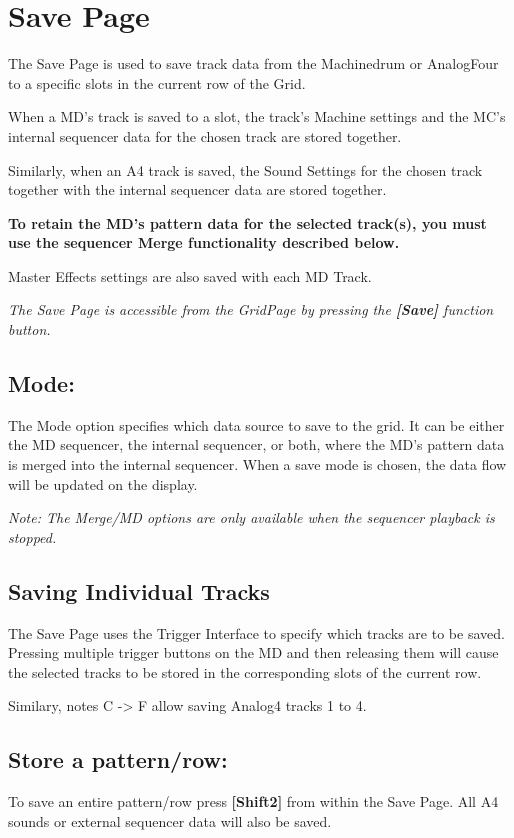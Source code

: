 \chapter{Save Page}

The Save Page is used to save track data from the Machinedrum or AnalogFour to a specific slots in the current row of the Grid.

When a MD's track is saved to a slot, the track's Machine settings and the MC's internal sequencer data for the chosen track are stored together.

Similarly, when an A4 track is saved, the Sound Settings for the chosen track together with the internal sequencer data are stored together.

\textbf{To retain the MD's pattern data for the selected track(s), you must use the sequencer Merge functionality described below.}

Master Effects settings are also saved with each MD Track.


\textit{The Save Page is accessible from the GridPage by pressing the  \textbf{[Save]} function button.}


\vspace{-0.5cm}

\section{Mode:}

\vspace{-0.5cm}


The Mode option specifies which data source to save to the grid. It can be either the MD sequencer, the internal sequencer, or both, where the MD's pattern data is merged into the internal sequencer. When a save mode is chosen, the data flow will be updated on the display.

\textit{Note: The Merge/MD options are only available when the sequencer playback is stopped.}

\section{Saving Individual Tracks}
The Save Page uses the Trigger Interface to specify which tracks are to be saved. Pressing multiple trigger buttons on the MD and then releasing them will cause the selected tracks to be stored in the corresponding slots of the current row.

Similary, notes C -> F allow saving Analog4 tracks 1 to 4.
\section{Store a pattern/row:}
To save an entire pattern/row press \textbf{[Shift2]} from within the Save Page. All A4 sounds or external sequencer data will also be saved.



